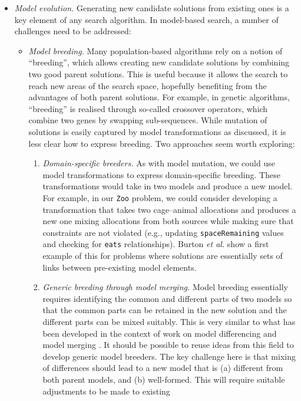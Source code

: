 \begin{itemize}
		\item \emph{Model evolution.} Generating new candidate solutions from existing ones is a key element of any search algorithm. In model-based search, a number of challenges need to be addressed:
					\begin{itemize}
						\item \emph{Model breeding.} Many population-based algorithms rely on a notion of ``breeding'', which allows creating new candidate solutions by combining two good parent solutions. This
						      is useful because it allows the search to reach new areas of the search space, hopefully benefiting from the advantages of both parent solutions. For example, in genetic algorithms,
									``breeding'' is realised through so-called crossover operators, which combine two genes by swapping sub-sequences. While mutation of solutions is easily captured by model
									transformations as discussed, it is less clear how to express breeding. Two approaches seem worth exploring:
									\begin{enumerate}
										\item \emph{Domain-specific breeders.} As with model mutation, we could use model transformations to express domain-specific breeding. These transformations would take in two
										      models and produce a new model. For example, in our \texttt{Zoo} problem, we could consider developing a transformation that takes two cage--animal allocations and produces
													a new one mixing allocations from both sources while making sure that constraints are not violated (e.g., updating \texttt{spaceRemaining} values and checking for 
													\texttt{eats} relationships). Burton \emph{et al.} \cite{Burton+12} show a first example of this for problems where solutions are essentially sets of links between 
													pre-existing model elements.
										\item \emph{Generic breeding through model merging.} Model breeding essentially requires identifying the common and different parts of two models so that the common parts can be
										      retained in the new solution and the different parts can be mixed suitably. This is very similar to what has been developed in the context of work on model differencing and
													model merging \cite{Kolovos09,Kolovos+09b,Maoz+10,Langer+14}. It should be possible to reuse ideas from this field to develop generic model breeders. The key challenge here is that mixing of
													differences should lead to a new model that is (a) different from both parent models, and (b) well-formed. This will require suitable adjustments to be made to existing 

\end{enumerate}
\end{itemize}
\end{itemize}
